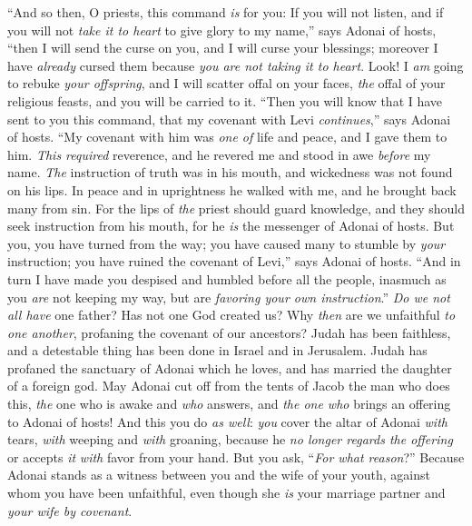 \begin{biblechapter} %
\verse “And so then, O priests, this command \textit{is} for you:
\verse If you will not listen, and if you will not \textit{take it to heart} to give glory to my name,” says Adonai of hosts, “then I will send the curse on you, and I will curse your blessings; moreover I have \textit{already} cursed them because \textit{you are not taking it to heart}.
\verse Look! I \textit{am} going to rebuke \textit{your offspring}, and I will scatter offal on your faces, \textit{the} offal of your religious feasts, and you will be carried to it.
\verse “Then you will know that I have sent to you this command, that my covenant with Levi \textit{continues},” says Adonai of hosts.
\verse “My covenant with him was \textit{one of} life and peace, and I gave them to him. \textit{This required} reverence, and he revered me and stood in awe \textit{before} my name.
\verse \textit{The} instruction of truth was in his mouth, and wickedness was not found on his lips. In peace and in uprightness he walked with me, and he brought back many from sin.
\verse For the lips of \textit{the} priest should guard knowledge, and they should seek instruction from his mouth, for he \textit{is} the messenger of Adonai of hosts.
\verse But you, you have turned from the way; you have caused many to stumble by \textit{your} instruction; you have ruined the covenant of Levi,” says Adonai of hosts.
\verse “And in turn I have made you despised and humbled before all the people, inasmuch as you \textit{are} not keeping my way, but are \textit{favoring your own instruction}.”
 \textit{Do we not all have} one father? Has not one God created us? Why \textit{then} are we unfaithful \textit{to one another}, profaning the covenant of our ancestors?
\verse Judah has been faithless, and a detestable thing has been done in Israel and in Jerusalem. Judah has profaned the sanctuary of Adonai which he loves, and has married the daughter of a foreign god.
\verse May Adonai cut off from the tents of Jacob the man who does this, \textit{the} one who is awake and \textit{who} answers, and \textit{the one who} brings an offering to Adonai of hosts!
\verse And this you do \textit{as well}: \textit{you} cover the altar of Adonai \textit{with} tears, \textit{with} weeping and \textit{with} groaning, because he \textit{no longer regards the offering} or accepts \textit{it} \textit{with} favor from your hand.
\verse But you ask, “\textit{For what reason}?” Because Adonai stands as a witness between you and the wife of your youth, against whom you have been unfaithful, even though she \textit{is} your marriage partner and \textit{your wife by covenant}.

\end{biblechapter}
